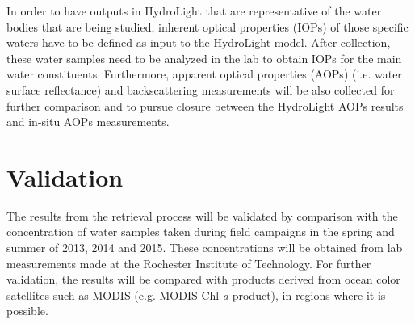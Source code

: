 In order to have outputs in HydroLight that are representative of the water bodies that are being studied, inherent optical properties (IOPs) of those specific waters have to be defined as input to the HydroLight model. After collection, these water samples need to be analyzed in the lab to obtain IOPs for the main water constituents. Furthermore, apparent optical properties (AOPs) (i.e. water surface reflectance) and backscattering measurements will be also collected for further comparison and to pursue closure between the HydroLight AOPs results and in-situ AOPs measurements.

\section{Validation}
The results from the retrieval process will be validated by comparison with the concentration of water samples taken during field campaigns in the spring and summer of 2013, 2014 and 2015. These concentrations will be obtained from lab measurements made at the Rochester Institute of Technology. For further validation, the results will be compared with products derived from ocean color satellites such as MODIS (e.g. MODIS Chl-{\it a} product), in regions where it is possible.





